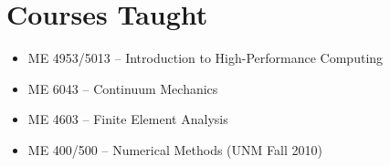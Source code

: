 \section*{Courses Taught}

  \begin{itemize}
    \item ME 4953/5013 -- Introduction to High-Performance Computing
    \item ME 6043 -- Continuum Mechanics
    \item ME 4603 -- Finite Element Analysis
    \item ME 400/500 -- Numerical Methods (UNM Fall 2010)
  \end{itemize}

